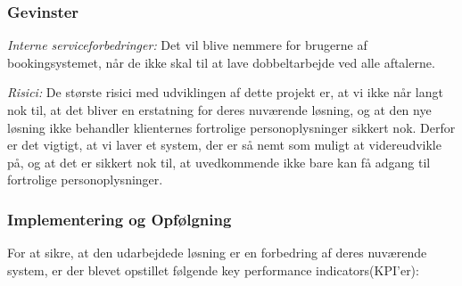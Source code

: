 \subsubsection{Gevinster}
\textit{Interne serviceforbedringer:}
Det vil blive nemmere for brugerne af bookingsystemet, når de ikke skal til at lave dobbeltarbejde ved alle aftalerne.

\textit{Risici:}
De største risici med udviklingen af dette projekt er, at vi ikke når langt nok til, at det bliver en erstatning for deres nuværende løsning, og at den nye løsning ikke behandler klienternes fortrolige personoplysninger sikkert nok.
Derfor er det vigtigt, at vi laver et system, der er så nemt som muligt at videreudvikle på, og at det er sikkert nok til, at uvedkommende ikke bare kan få adgang til fortrolige personoplysninger.

\subsubsection{Implementering og Opfølgning}

For at sikre, at den udarbejdede løsning er en forbedring af deres nuværende system, er der blevet opstillet følgende key performance indicators(KPI'er):

